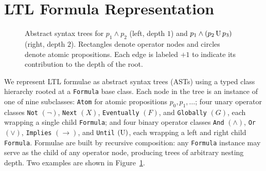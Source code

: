 \documentclass[titlepage,a4paper,11pt]{report}
\begin{document}
    \section{LTL Formula Representation}\label{sec:formula_representation}
    \begin{figure}
        \centering
        \caption{Abstract syntax trees for $p_1 \land p_2$ (left, depth $1$) and $p_1 \land (p_2 \, \text{U} \, p_3)$ (right, depth $2$). Rectangles denote operator nodes and circles denote atomic propositions. Each edge is labeled $+1$ to indicate its contribution to the depth of the root.}
        \vspace{8pt}
        \hspace{25pt}
        \label{fig:formula_ast}
    \end{figure}

    We represent LTL formulae as abstract syntax trees (ASTs) using a typed class hierarchy rooted at a \texttt{Formula} base class. Each node in the tree is an instance of one of nine subclasses: \texttt{Atom} for atomic propositions $p_0, p_1, \ldots$; four unary operator classes \texttt{Not} $(\neg)$, \texttt{Next} $(X)$, \texttt{Eventually} $(F)$, and \texttt{Globally} $(G)$, each wrapping a single child \texttt{Formula}; and four binary operator classes \texttt{And} $(\land)$, \texttt{Or} $(\lor)$, \texttt{Implies} $(\to)$, and \texttt{Until} $(\text{U})$, each wrapping a left and right child \texttt{Formula}. Formulae are built by recursive composition: any \texttt{Formula} instance may serve as the child of any operator node, producing trees of arbitrary nesting depth. Two examples are shown in Figure~\ref{fig:formula_ast}.
\end{document}
